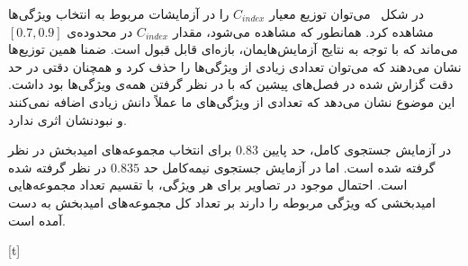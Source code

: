 در شکل~ می‌توان توزیع معیار $C_{index}$ را در آزمایشات مربوط به انتخاب ویژگی‌ها مشاهده کرد. همانطور که مشاهده می‌شود، مقدار $C_{index}$ در محدوده‌ی 
$\left[0.7, 0.9\right]$
می‌ماند که با توجه به نتایج آزمایش‌هایمان، بازه‌ای قابل قبول است. ضمنا همین توزیع‌ها نشان می‌دهند که می‌توان تعدادی زیادی از ویژگی‌ها را حذف کرد و همچنان دقتی در حد دقت گزارش شده در فصل‌های پیشین که با در نظر گرفتن همه‌ی ویژگی‌ها بود داشت. این موضوع نشان می‌دهد که تعدادی از ویژگی‌های ما عملاً دانش زیادی اضافه نمی‌کنند و نبودنشان اثری ندارد.

در آزمایش جستجوی کامل، حد پایین $0.83$ برای انتخاب مجموعه‌‌های امیدبخش در نظر گرفته شده است. اما در آزمایش جستجوی‌ نیمه‌کامل حد $0.835$ در نظر گرفته شده است. احتمال موجود در تصاویر برای هر ویژگی، با تقسیم تعداد مجموعه‌هایی امیدبخشی که ویژگی مربوطه را دارند بر تعداد کل مجموعه‌های امیدبخش به دست آمده است.

\pgfplotsset{width=7.5cm,compat=1.12}
[t]\centering


